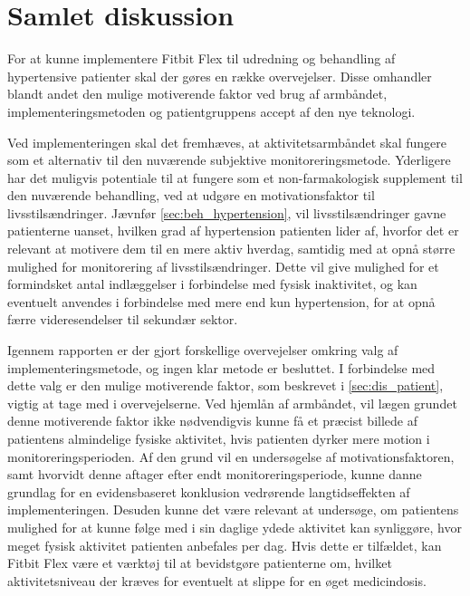 \section{Samlet diskussion}

For at kunne implementere Fitbit Flex til udredning og behandling af hypertensive patienter skal der gøres en række overvejelser. Disse omhandler blandt andet den mulige motiverende faktor ved brug af armbåndet, implementeringsmetoden og patientgruppens accept af den nye teknologi. 

Ved implementeringen skal det fremhæves, at aktivitetsarmbåndet skal fungere som et alternativ til den nuværende subjektive monitoreringsmetode. Yderligere har det muligvis potentiale til at fungere som et non-farmakologisk supplement til den nuværende behandling, ved at udgøre en motivationsfaktor til livsstilsændringer. Jævnfør \autoref{sec:beh_hypertension}, vil livsstilsændringer gavne patienterne uanset, hvilken grad af hypertension patienten lider af, hvorfor det er relevant at motivere dem til en mere aktiv hverdag, samtidig med at opnå større mulighed for monitorering af livsstilsændringer. Dette vil give mulighed for et formindsket antal indlæggelser i forbindelse med fysisk inaktivitet, og kan eventuelt anvendes i forbindelse med mere end kun hypertension, for at opnå færre videresendelser til sekundær sektor.

Igennem rapporten er der gjort forskellige overvejelser omkring valg af implementeringsmetode, og ingen klar metode er besluttet. I forbindelse med dette valg er den mulige motiverende faktor, som beskrevet i \autoref{sec:dis_patient}, vigtig at tage med i overvejelserne. Ved hjemlån af armbåndet, vil lægen grundet denne motiverende faktor ikke nødvendigvis kunne få et præcist billede af patientens almindelige fysiske aktivitet, hvis patienten dyrker mere motion i monitoreringsperioden. Af den grund vil en undersøgelse af motivationsfaktoren, samt hvorvidt denne aftager efter endt monitoreringsperiode, kunne danne grundlag for en evidensbaseret konklusion vedrørende langtidseffekten af implementeringen. Desuden kunne det være relevant at undersøge, om patientens mulighed for at kunne følge med i sin daglige ydede aktivitet kan synliggøre, hvor meget fysisk aktivitet patienten anbefales per dag. Hvis dette er tilfældet, kan Fitbit Flex være et værktøj til at bevidstgøre patienterne om, hvilket aktivitetsniveau der kræves for eventuelt at slippe for en øget medicindosis. 

